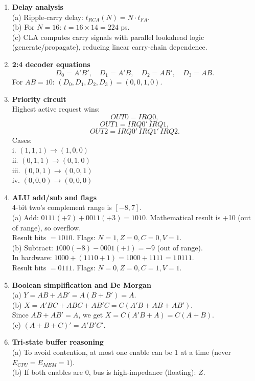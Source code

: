 \documentclass[11pt]{article}
\begin{document}
\begin{enumerate}[label=\textbf{B\arabic*.}]
  \item \textbf{Delay analysis}\\
  (a) Ripple-carry delay: \(t_{RCA}(N)=N\cdot t_{FA}\).\\
  (b) For \(N=16\): \(t=16\times14=224\) ps.\\
  (c) CLA computes carry signals with parallel lookahead logic (generate/propagate), reducing linear carry-chain dependence.

  \item \textbf{2:4 decoder equations}\\
  \[
  D_0=A'B',\quad D_1=A'B,\quad D_2=AB',\quad D_3=AB.
  \]
  For \(AB=10\): \((D_0,D_1,D_2,D_3)=(0,0,1,0)\).

  \item \textbf{Priority circuit}\\
  Highest active request wins:
  \[
  OUT0=IRQ0,
  \]
  \[
  OUT1=IRQ0'\,IRQ1,
  \]
  \[
  OUT2=IRQ0'\,IRQ1'\,IRQ2.
  \]
  Cases:\\
  i. \((1,1,1)\to(1,0,0)\)\\
  ii. \((0,1,1)\to(0,1,0)\)\\
  iii. \((0,0,1)\to(0,0,1)\)\\
  iv. \((0,0,0)\to(0,0,0)\)

  \item \textbf{ALU add/sub and flags}\\
  4-bit two's complement range is \([-8,7]\).\\
  (a) Add: \(0111(+7)+0011(+3)=1010\). Mathematical result is +10 (out of range), so overflow.\\
  Result bits \(=1010\). Flags: \(N=1, Z=0, C=0, V=1\).\\
  (b) Subtract: \(1000(-8)-0001(+1)=-9\) (out of range).\\
  In hardware: \(1000 + (1110 + 1)=1000+1111=1\,0111\).\\
  Result bits \(=0111\). Flags: \(N=0, Z=0, C=1, V=1\).

  \item \textbf{Boolean simplification and De Morgan}\\
  (a) \(Y=AB+AB'=A(B+B')=A\).\\
  (b) \(X=A'BC + ABC + AB'C = C(A'B+AB+AB')\).\\
  Since \(AB+AB'=A\), we get \(X=C(A'B + A)=C(A + B)\).\\
  (c) \((A+B+C)' = A'B'C'\).

  \item \textbf{Tri-state buffer reasoning}\\
  (a) To avoid contention, at most one enable can be 1 at a time (never \(E_{CPU}=E_{MEM}=1\)).\\
  (b) If both enables are 0, bus is high-impedance (floating): \(Z\).
\end{enumerate}
\end{document}

